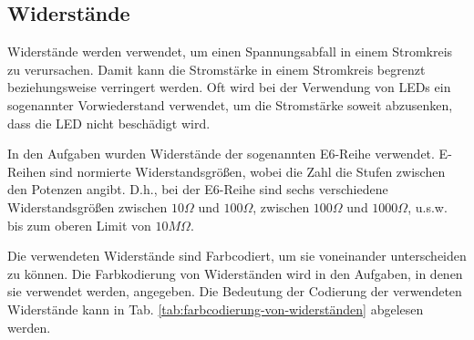 \subsection{Widerstände}
\label{subsec:widerstände}

Widerstände werden verwendet, um einen Spannungsabfall in einem Stromkreis zu verursachen.
Damit kann die Stromstärke in einem Stromkreis begrenzt beziehungsweise verringert werden.
Oft wird bei der Verwendung von LEDs ein sogenannter Vorwiederstand verwendet, um die Stromstärke soweit abzusenken, dass die LED nicht beschädigt wird.

In den Aufgaben wurden Widerstände der sogenannten E6-Reihe verwendet.
E-Reihen sind normierte Widerstandsgrößen, wobei die Zahl die Stufen zwischen den Potenzen angibt.
D.h., bei der E6-Reihe sind sechs verschiedene Widerstandsgrößen zwischen $10\Omega$ und $100\Omega$, zwischen $100\Omega$ und $1000\Omega$, u.s.w. bis zum oberen Limit von $10M\Omega$.

Die verwendeten Widerstände sind Farbcodiert, um sie voneinander unterscheiden zu können.
Die Farbkodierung von Widerständen wird in den Aufgaben, in denen sie verwendet werden, angegeben.
Die Bedeutung der Codierung der verwendeten Widerstände kann in Tab. \ref{tab:farbcodierung-von-widerständen} abgelesen werden.

